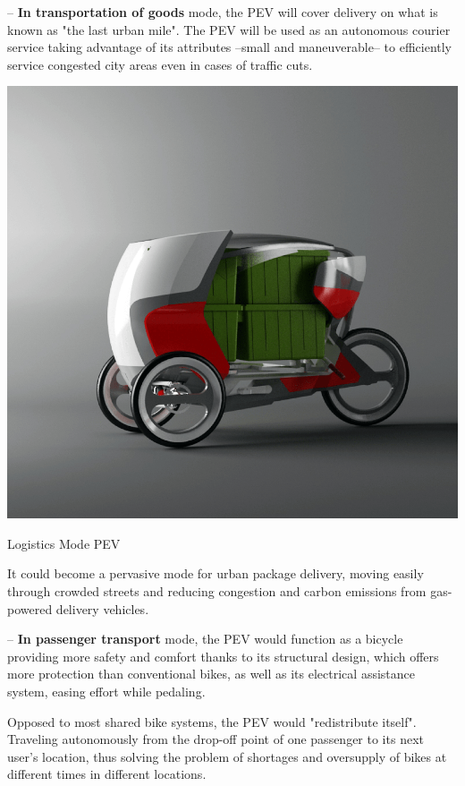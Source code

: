 -- \textbf{In transportation of goods} mode, the PEV will cover delivery on what is known as "the last urban mile". The PEV will be used as an autonomous courier service taking advantage of its attributes --small and maneuverable-- to efficiently service congested city areas even in cases of traffic cuts. 

\begin{marginfigure}
	\includegraphics[width=\linewidth]{figs/01/folded}
	\caption{Logistics Mode PEV}
\end{marginfigure}

It could become a pervasive mode for urban package delivery, moving easily through crowded streets and reducing congestion and carbon emissions from gas-powered delivery vehicles.

-- \textbf{In passenger transport} mode, the PEV would function as a bicycle providing more safety and comfort thanks to its structural design, which offers more protection than conventional bikes, as well as its electrical assistance system, easing effort while pedaling.

Opposed to most shared bike systems, the PEV would "redistribute itself". Traveling autonomously from the drop-off point of one passenger to its next user's location, thus solving the problem of shortages and oversupply of bikes at different times in different locations. 

